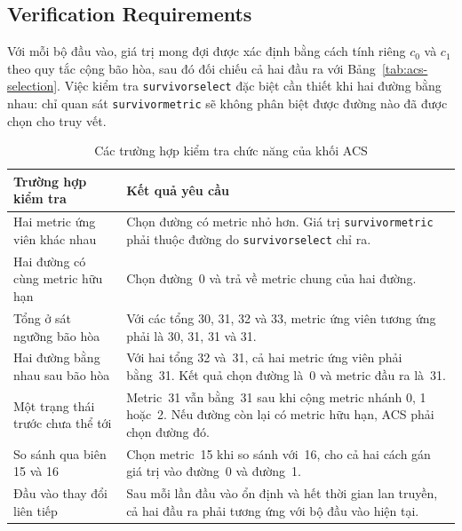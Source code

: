 \documentclass[12pt,a4paper]{article}
\renewcommand{\_}{\originalunderscore\allowbreak}
\begin{document}
\subsection{Verification Requirements}

Với mỗi bộ đầu vào, giá trị mong đợi được xác định bằng cách tính
riêng $c_0$ và $c_1$ theo quy tắc cộng bão hòa, sau đó đối chiếu
cả hai đầu ra với Bảng~\ref{tab:acs-selection}. Việc kiểm tra
\texttt{survivor\_select} đặc biệt cần thiết khi hai đường bằng nhau:
chỉ quan sát \texttt{survivor\_metric} sẽ không phân biệt được đường
nào đã được chọn cho truy vết.

\begin{table}[H]
    \centering
    \small
    \begin{tabularx}{\textwidth}{@{}P{4.1cm}Y@{}}
        \toprule
        \textbf{Trường hợp kiểm tra} & \textbf{Kết quả yêu cầu} \\
        \midrule
        Hai metric ứng viên khác nhau
        & Chọn đường có metric nhỏ hơn. Giá trị
          \texttt{survivor\_metric} phải thuộc đường do
          \texttt{survivor\_select} chỉ ra. \\

        Hai đường có cùng metric hữu hạn
        & Chọn đường~0 và trả về metric chung của hai đường. \\

        Tổng ở sát ngưỡng bão hòa
        & Với các tổng 30, 31, 32 và 33, metric ứng viên tương ứng
          phải là 30, 31, 31 và 31. \\

        Hai đường bằng nhau sau bão hòa
        & Với hai tổng 32 và~31, cả hai metric ứng viên phải bằng~31.
          Kết quả chọn đường là~0 và metric đầu ra là~31. \\

        Một trạng thái trước chưa thể tới
        & Metric~31 vẫn bằng~31 sau khi cộng metric nhánh 0, 1
          hoặc~2. Nếu đường còn lại có metric hữu hạn, ACS phải
          chọn đường đó. \\

        So sánh qua biên 15 và 16
        & Chọn metric~15 khi so sánh với~16, cho cả hai cách gán
          giá trị vào đường~0 và đường~1. \\

        Đầu vào thay đổi liên tiếp
        & Sau mỗi lần đầu vào ổn định và hết thời gian lan truyền,
          cả hai đầu ra phải tương ứng với bộ đầu vào hiện tại. \\
        \bottomrule
    \end{tabularx}
    \caption{Các trường hợp kiểm tra chức năng của khối ACS}
    \label{tab:acs-verification}
\end{table}
\end{document}
